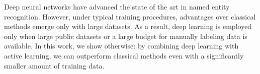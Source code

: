 Deep neural networks have advanced the state of the art in named entity recognition. However, under typical training procedures, advantages over classical methods emerge only with large datasets. As a result,  deep learning is employed only when large public datasets or a large budget for manually labeling data is available. In this work, we show otherwise: by combining deep learning with active learning, we can outperform classical methods even with a significantly smaller amount of training data.
